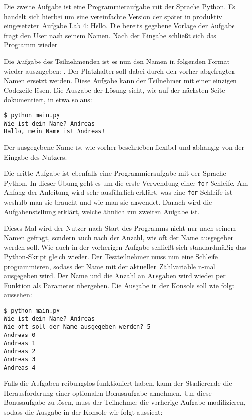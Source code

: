 Die zweite Aufgabe ist eine Programmieraufgabe mit der Sprache Python. Es
handelt sich hierbei um eine vereinfachte Version der später in produktiv
eingesetzten Aufgabe \glqq Lab 4: Hello\grqq{}. Die bereits gegebene Vorlage der
Aufgabe fragt den User nach seinem Namen. Nach der Eingabe schließt sich das
Programm wieder. \parencite{git-repo:first-loop}

Die Aufgabe des Teilnehmenden ist es nun den Namen in folgenden
Format wieder auszugeben: . Der Platzhalter
 soll dabei durch den vorher abgefragten Namen ersetzt werden.
Diese Aufgabe kann der Teilnehmer mit einer einzigen Codezeile lösen. Die
Ausgabe der Lösung sieht, wie auf der nächsten Seite dokumentiert, in etwa so
aus:

\begin{lstlisting}[style=Bash]
$ python main.py
Wie ist dein Name? Andreas
Hallo, mein Name ist Andreas!
\end{lstlisting}

Der ausgegebene Name ist wie vorher beschrieben flexibel und abhängig von der
Eingabe des Nutzers.

Die dritte Aufgabe ist ebenfalls eine Programmieraufgabe mit der Sprache Python.
In dieser Übung geht es um die erste Verwendung einer \texttt{for}-Schleife.
Am Anfang der Anleitung wird sehr ausführlich erklärt, was eine
\texttt{for}-Schleife ist, weshalb man sie braucht und wie man sie anwendet.
Danach wird die Aufgabenstellung erklärt, welche ähnlich zur zweiten Aufgabe
ist. \parencite{git-repo:first-loop}

Dieses Mal wird der Nutzer nach Start des Programms nicht nur nach seinem
Namen gefragt, sondern auch nach der Anzahl, wie oft der Name ausgegeben werden
soll. Wie auch in der vorherigen Aufgabe schließt sich standardmäßig das
Python-Skript gleich wieder. Der Testteilnehmer muss nun eine Schleife
programmieren, sodass der Name mit der aktuellen Zählvariable n-mal ausgegeben
wird. Der Name und die Anzahl an Ausgaben wird wieder per Funktion als Parameter
übergeben. Die Ausgabe in der Konsole soll wie folgt aussehen:

\begin{lstlisting}[style=Bash]
$ python main.py
Wie ist dein Name? Andreas
Wie oft soll der Name ausgegeben werden? 5
Andreas 0
Andreas 1
Andreas 2
Andreas 3
Andreas 4
\end{lstlisting}

\newpage

Falls die Aufgaben reibungslos funktioniert haben, kann der Studierende
die Herausforderung einer optionalen Bonusaufgabe annehmen. Um diese
Bonusaufgabe zu lösen, muss der Teilnehmer die vorherige Aufgabe modifizieren,
sodass die Ausgabe in der Konsole wie folgt aussieht:

